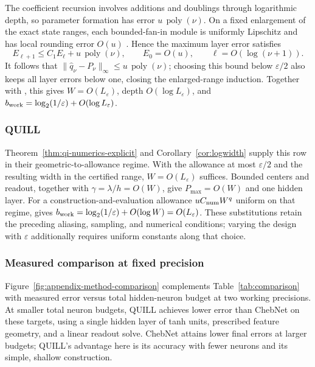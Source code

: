 The coefficient recursion involves additions and doublings through logarithmic
depth, so parameter formation has error $u\,\operatorname{poly}(\nu)$.
On a fixed enlargement of the exact state ranges, each bounded-fan-in module
is uniformly Lipschitz and has local rounding error $O(u)$
\cite[Chs.~2--3]{Higham2002}. Hence the maximum layer error satisfies
\[
 E_{\ell+1}\le C_1E_\ell+u\,\operatorname{poly}(\nu),
 \qquad E_0=O(u),\qquad \ell=O(\log(\nu+1)).
\]
It follows that $\|\widehat q_\nu-P_\nu\|_\infty\le
u\,\operatorname{poly}(\nu)$; choosing this bound below $\varepsilon/2$
also keeps all layer errors below one, closing the enlarged-range induction.
Together with , this gives $W=O(L_\varepsilon)$,
depth $O(\log L_\varepsilon)$, and
$b_{\rm work}=\log_2(1/\varepsilon)+O(\log L_\varepsilon)$.

\subsubsection{QUILL}
Theorem~\ref{thm:qi-numerics-explicit} and Corollary~\ref{cor:logwidth}
supply this row in their geometric-to-allowance regime. With the allowance
at most $\varepsilon/2$ and the resulting width in the certified range,
$W=O(L_\varepsilon)$ suffices. Bounded centers and readout, together with
$\gamma=\lambda/h=O(W)$, give $P_{\max}=O(W)$ and one hidden layer.
For a construction-and-evaluation allowance $uC_{\rm num}W^q$ uniform on
that regime,  gives
$b_{\rm work}=\log_2(1/\varepsilon)+O(\log W)=O(L_\varepsilon)$.
These substitutions retain the preceding aliasing, sampling, and numerical
conditions; varying the design with $\varepsilon$ additionally requires
uniform constants along that choice.

\subsubsection{Measured comparison at fixed precision}
\label{app:measured-method-comparison}

Figure~\ref{fig:appendix-method-comparison} complements
Table~\ref{tab:comparison} with measured error versus total
hidden-neuron budget at two working precisions. At smaller total neuron budgets, QUILL achieves lower error than
ChebNet on these targets, using a single hidden layer of tanh units, prescribed feature geometry, and a linear readout solve. ChebNet attains lower final errors at larger budgets; QUILL's advantage here is its accuracy with fewer neurons and its simple, shallow construction.

